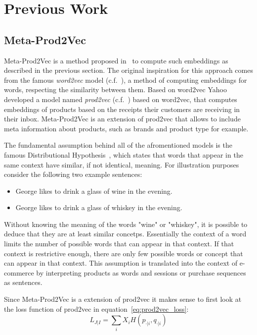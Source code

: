 \section{Previous Work}
\subsection{Meta-Prod2Vec}\label{sec:meta_prod2vec}
Meta-Prod2Vec is a method proposed in~\cite{meta_prod2vec} to compute such embeddings as described in the previous section.
The original inspiration for this approach comes from the famous \emph{word2vec} model (c.f.~\cite{word2vec}), a method of computing embeddings for words, respecting the similarity between them.
Based on word2vec Yahoo developed a model named \emph{prod2vec} (c.f.~\cite{prod2vec}) based on word2vec, that computes embeddings of products based on the receipts their customers are receiving in their inbox.
Meta-Prod2Vec is an extension of prod2vec that allows to include meta information about products, such as brands and product type for example.
\par
The fundamental assumption behind all of the afromentioned models is the famous Distributional Hypothesis~\cite{distributional}, which states that words that appear in the same context have similar, if not identical, meaning.
For illustration purposes consider the following two example sentences:
\begin{itemize}
    \item George likes to drink a glass of wine in the evening.
    \item George likes to drink a glass of whiskey in the evening.
\end{itemize}
Without knowing the meaning of the words "wine" or "whiskey", it is possible to deduce that they are at least similar concetps.
Essentially the context of a word limits the number of possible words that can appear in that context.
If that context is restrictive enough, there are only few possible words or concept that can appear in that context.
This assumption is translated into the context of e-commerce by interpreting products as words and sessions or purchase sequences as sentences.
\par
Since Meta-Prod2Vec is a extension of prod2vec it makes sense to first look at the loss function of prod2vec in equation~\ref{eq:prod2vec_loss}:
\begin{equation}\label{eq:prod2vec_loss}
    L_{J|I} = \sum_i X_iH(p_{\cdot|i},q_{\cdot|i})
\end{equation}
